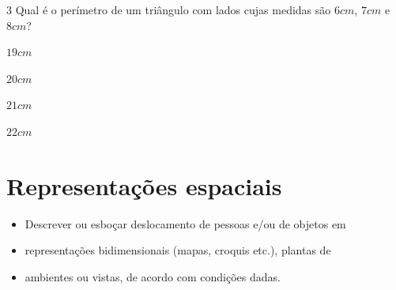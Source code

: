 {{%




\num{3} Qual é o perímetro de um triângulo com lados cujas medidas são $6 cm$,
$7 cm$ e $8 cm$?

\begin{escolha}[itemsep=0pt]
\item $19 cm$
\item $20 cm$
\item $21 cm$ 
\item $22 cm$
\end{escolha}














\chapter{Representações espaciais}

\begin{itemize}
  \item Descrever ou esboçar deslocamento de pessoas e/ou de objetos em
  \item representações bidimensionais (mapas, croquis etc.), plantas de
  \item ambientes ou vistas, de acordo com condições dadas.
\end{itemize}


}}
